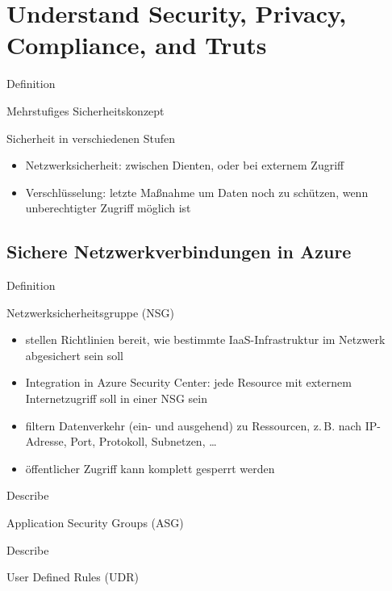 \documentclass{scrartcl}
\newenvironment{flashcard}[2][]{%
    #1
    \vfill
    \centerline{\Large{#2}}
    \vfill
\newpage
}
{\newpage}
\newcommand{\sectioncard}[1]{
    \vspace*{\stretch{1}}
    \section{#1}
    \vspace*{\stretch{1}}
    \pagebreak
}
\newcommand{\subsectioncard}[1]{
    \vspace*{\stretch{1}}
    \subsection{#1}
    \vspace*{\stretch{1}}
    \pagebreak
}
\begin{document}
    \sectioncard{Understand Security, Privacy, Compliance, and Truts}

    \begin{flashcard}[Definition]{Mehrstufiges Sicherheitskonzept}
        Sicherheit in verschiedenen Stufen
        \begin{itemize}
            \item Netzwerksicherheit: zwischen Dienten, oder bei externem Zugriff
            \item Verschlüsselung: letzte Maßnahme um Daten noch zu schützen, wenn unberechtigter Zugriff möglich ist
        \end{itemize}
    \end{flashcard}

    \subsectioncard{Sichere Netzwerkverbindungen in Azure}

    \begin{flashcard}[Definition]{Netzwerksicherheitsgruppe (NSG)}
        \begin{itemize}
            \item stellen Richtlinien bereit, wie bestimmte IaaS-Infrastruktur im Netzwerk abgesichert sein soll
            \item Integration in Azure Security Center: jede Resource mit externem Internetzugriff soll in einer NSG sein
            \item filtern Datenverkehr (ein- und ausgehend) zu Ressourcen, z.\,B. nach IP-Adresse, Port, Protokoll, Subnetzen, \ldots
            \item öffentlicher Zugriff kann komplett gesperrt werden
        \end{itemize}

    \end{flashcard}

    \begin{flashcard}[Describe]{Application Security Groups (ASG)}

    \end{flashcard}

    \begin{flashcard}[Describe]{User Defined Rules (UDR)}

    \end{flashcard}
\end{document}
